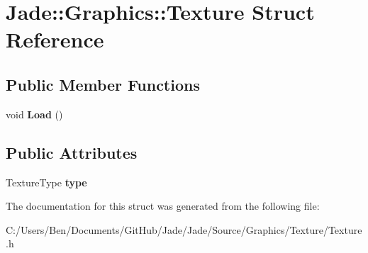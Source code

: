 \hypertarget{struct_jade_1_1_graphics_1_1_texture}{}\section{Jade\+:\+:Graphics\+:\+:Texture Struct Reference}
\label{struct_jade_1_1_graphics_1_1_texture}
\subsection*{Public Member Functions}
\begin{DoxyCompactItemize}
\item 
\hypertarget{struct_jade_1_1_graphics_1_1_texture_a2bc492f9365e548a50df5fbbca65aa14}{}void {\bfseries Load} ()\label{struct_jade_1_1_graphics_1_1_texture_a2bc492f9365e548a50df5fbbca65aa14}

\end{DoxyCompactItemize}
\subsection*{Public Attributes}
\begin{DoxyCompactItemize}
\item 
\hypertarget{struct_jade_1_1_graphics_1_1_texture_aa1117840ee3fb1cc71b5234013bfeeee}{}Texture\+Type {\bfseries type}\label{struct_jade_1_1_graphics_1_1_texture_aa1117840ee3fb1cc71b5234013bfeeee}

\end{DoxyCompactItemize}


The documentation for this struct was generated from the following file\+:\begin{DoxyCompactItemize}
\item 
C\+:/\+Users/\+Ben/\+Documents/\+Git\+Hub/\+Jade/\+Jade/\+Source/\+Graphics/\+Texture/Texture.\+h\end{DoxyCompactItemize}
